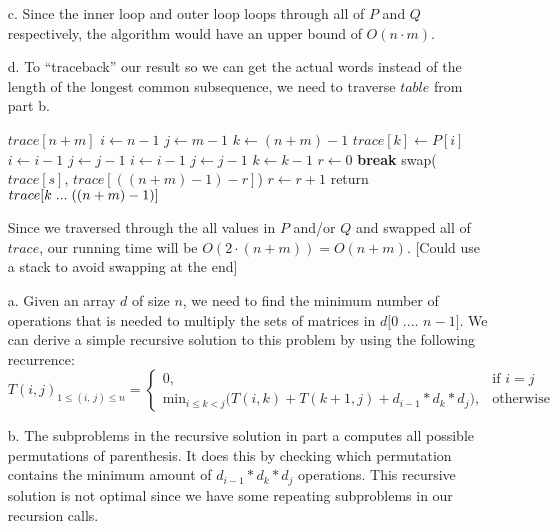 \documentclass[11pt]{article}
\begin{document}
\begin{itemize}
\item[c.]
Since the inner loop and outer loop loops through all of $P$ and $Q$ respectively, the algorithm would have an upper bound of $\boxed{O(n \cdot m)}$.

\item[d.]
To ``traceback'' our result so we can get the actual words instead of the length of the longest common subsequence, we need to traverse $table$ from part b. 

\begin{algorithmic}[1]
	\State $trace[n+m]$  
	\State $i \gets n - 1$
	\State $j \gets m - 1$
	\State $k \gets (n+m)-1$
			\State $trace[k] \gets P[i]$
			\State $i \gets i -1$
			\State $j \gets j - 1$
			\State $i \gets i - 1$
		\Else
			\State $j \gets j - 1$
		\EndIf
		\State $k \gets k - 1$
	\EndWhile 
	\State $r \gets 0$
	 
			\State \textbf{break}
		\EndIf
		\State swap($trace[s]$, $trace[((n+m)-1)-r]$)  
		\State $r \gets r + 1$		
	\EndFor
	\State return $trace[k \hspace{1mm} ... \hspace{1mm} ((n+m)-1)]$
\EndFunction
\end{algorithmic}

Since we traversed through the all values in $P$ and/or $Q$ and swapped all of $trace$, our running time will be $O(2 \cdot (n + m)) = \boxed{O(n + m)}$. [Could use a stack to avoid swapping at the end]

\item[a.] 
Given an array $d$ of size $n$, we need to find the minimum number of operations that is needed to multiply the sets of matrices in $d[0$ .... $n-1]$. We can derive a simple recursive solution to this problem by using the following recurrence:
$$\boxed{{\displaystyle T(i,j)_{1\leq (i\text{, }j) \leq n}={
\begin{cases}{0},&{\text{if }} i = j\\ \text{min}_{i \leq k < j} \big(T(i, k) + T(k+1, j) + d_{i-1} * d_k * d_j \big),&{\text{otherwise}} 
\end{cases}}}}$$

\item[b.]
	The subproblems in the recursive solution in part a computes all possible permutations of parenthesis.  It does this by checking which permutation contains the minimum amount of $d_{i-1} * d_k * d_j$ operations. This recursive solution is not optimal since we have some repeating subproblems in our recursion calls.


\end{itemize}
\end{document}
